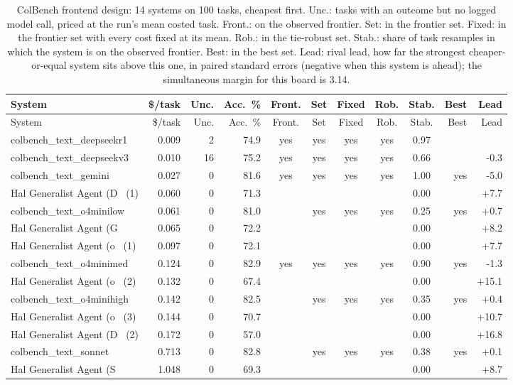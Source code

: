 {\begin{longtable}{lrrrcccccrr}
\caption{ColBench frontend design: 14 systems on 100 tasks, cheapest first. Unc.: tasks with an outcome but no logged model call, priced at the run's mean costed task. Front.: on the observed frontier. Set: in the frontier set. Fixed: in the frontier set with every cost fixed at its mean. Rob.: in the tie-robust set. Stab.: share of task resamples in which the system is on the observed frontier. Best: in the best set. Lead: rival lead, how far the strongest cheaper-or-equal system sits above this one, in paired standard errors (negative when this system is ahead); the simultaneous margin for this board is 3.14.}\label{tab:supp-hal_colbench_frontend_design}\\
\toprule
System & \$/task & Unc. & Acc.\ \% & Front. & Set & Fixed & Rob. & Stab. & Best & Lead \\
\midrule
\endfirsthead
\toprule
System & \$/task & Unc. & Acc.\ \% & Front. & Set & Fixed & Rob. & Stab. & Best & Lead \\
\midrule
\endhead
\bottomrule
\endfoot
colbench\_text\_deepseekr1 & 0.009 & 2 & 74.9 & yes & yes & yes & yes & 0.97 &  &  \\
colbench\_text\_deepseekv3 & 0.010 & 16 & 75.2 & yes & yes & yes & yes & 0.66 &  & -0.3 \\
colbench\_text\_gemini & 0.027 & 0 & 81.6 & yes & yes & yes & yes & 1.00 & yes & -5.0 \\
Hal Generalist Agent (D~ (1) & 0.060 & 0 & 71.3 &  &  &  &  & 0.00 &  & +7.7 \\
colbench\_text\_o4minilow & 0.061 & 0 & 81.0 &  & yes & yes & yes & 0.25 & yes & +0.7 \\
Hal Generalist Agent (G~ & 0.065 & 0 & 72.2 &  &  &  &  & 0.00 &  & +8.2 \\
Hal Generalist Agent (o~ (1) & 0.097 & 0 & 72.1 &  &  &  &  & 0.00 &  & +7.7 \\
colbench\_text\_o4minimed~ & 0.124 & 0 & 82.9 & yes & yes & yes & yes & 0.90 & yes & -1.3 \\
Hal Generalist Agent (o~ (2) & 0.132 & 0 & 67.4 &  &  &  &  & 0.00 &  & +15.1 \\
colbench\_text\_o4minihigh & 0.142 & 0 & 82.5 &  & yes & yes & yes & 0.35 & yes & +0.4 \\
Hal Generalist Agent (o~ (3) & 0.144 & 0 & 70.7 &  &  &  &  & 0.00 &  & +10.7 \\
Hal Generalist Agent (D~ (2) & 0.172 & 0 & 57.0 &  &  &  &  & 0.00 &  & +16.8 \\
colbench\_text\_sonnet & 0.713 & 0 & 82.8 &  & yes & yes & yes & 0.38 & yes & +0.1 \\
Hal Generalist Agent (S~ & 1.048 & 0 & 69.3 &  &  &  &  & 0.00 &  & +8.7 \\
\end{longtable}

}
